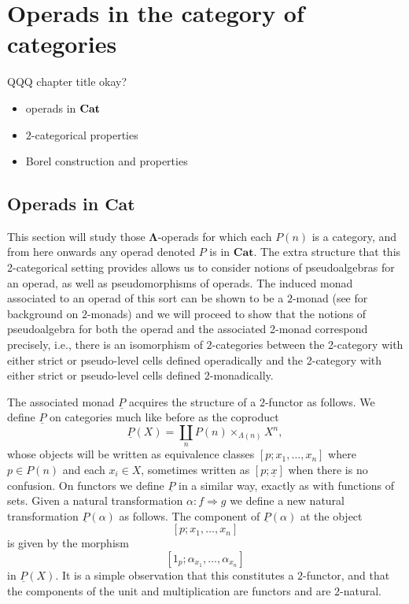 \documentclass{amsbook} %
\newcommand{\mb}{\mathbf}
\newcommand{\ML}{\mathbf{\Lambda}}
\numberwithin{section}{chapter}
\begin{document}
\chapter{Operads in the category of categories}
 QQQ chapter title okay?
 	\begin{itemize}
 		\item operads in $\bf{Cat}$
 		\item $2$-categorical properties
 		\item Borel construction and properties
 	\end{itemize}
\section{Operads in \texorpdfstring{$\mb{Cat}$}{\textbf{Cat}}}\label{section:operads_in_Cat}

This section will study those $\ML$-operads for which each $P(n)$ is a category, and from here onwards any operad denoted $P$ is in $\mb{Cat}$. The extra structure that this 2-categorical setting provides allows us to consider notions of pseudoalgebras for an operad, as well as pseudomorphisms of operads. The induced monad associated to an operad of this sort can be shown to be a $2$-monad (see \cite{KS} for background on $2$-monads) and we will proceed to show that the notions of pseudoalgebra for both the operad and the associated 2-monad correspond precisely, i.e., there is an isomorphism of $2$-categories between the 2-category with either strict or pseudo-level cells defined operadically and the 2-category with either strict or pseudo-level cells defined 2-monadically.



The associated monad $\underline{P}$ acquires the structure of a $2$-functor as follows. We define $\underline{P}$ on categories much like before as  the coproduct
	\[
		\underline{P}(X) = \coprod_n P(n) \times_{\Lambda(n)} X^n,
	\]
whose objects will be written as equivalence classes $[p;x_1,\ldots,x_n]$ where $p \in P(n)$ and each $x_i \in X$, sometimes written as $[p;\underline{x}]$ when there is no confusion. On functors we define $\underline{P}$ in a similar way, exactly as with functions of sets. Given a natural transformation $\alpha \colon f \Rightarrow g$ we define a new natural transformation $\underline{P}(\alpha)$ as follows. The component of $\underline{P}(\alpha)$ at the object
	\[
		[p;x_1,\ldots,x_n]
	\]
is given by the morphism
	\[
		[1_p;\alpha_{x_1},\ldots,\alpha_{x_n}]
	\]
in $\underline{P}(X)$.
It is a simple observation that this constitutes a $2$-functor, and that the components of the unit and multiplication are functors and are $2$-natural.
\end{document}
